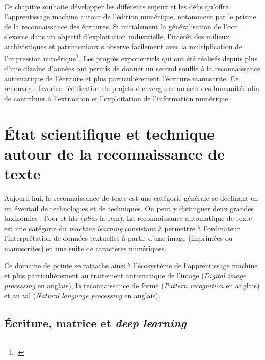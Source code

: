 	Ce chapitre souhaite développer les différents enjeux et les défis qu'offre l'apprentissage machine autour de l'édition numérique, notamment par le prisme de la reconnaissance des écritures. Si initialement la généralisation de l'\gls{ocr} s'exerce dans un objectif d'exploitation industrielle, l'intérêt des milieux archivistiques et patrimoniaux s'observe facilement avec la multiplication de l'impression numérique\footcite{mouffletAnsExperimentationTechnologie2021}. Les progrès exponentiels qui ont été réalisés depuis plus d'une dizaine d'années ont permis de donner un second souffle à la reconnaissance automatique de l'écriture et plus particulièrement l'écriture manuscrite. Ce renouveau favorise l'édification de projets d'envergures au sein des humanités afin de contribuer à l'extraction et l'exploitation de l'information numérique.
	
	\section{État scientifique et technique autour de la reconnaissance de texte}
	
	Aujourd'hui, la reconnaissance de texte est une catégorie générale se déclinant en un éventail de technologies et de techniques. On peut y distinguer deux grandes taxinomies : l'\gls{ocr} et \gls{htr} (\textit{alias} la \gls{rem}). La reconnaissance automatique de texte est une catégorie du \textit{machine learning} consistant à permettre à l'ordinateur l'interprétation de données textuelles à partir d'une image (imprimées ou manuscrites) en une suite de caractères numériques.
	
	Ce domaine de pointe se rattache ainsi à l'écosystème de l'apprentissage machine et plus particulièrement au traitement automatique de l'image (\textit{Digital image processing} en anglais), la reconnaissance de forme (\textit{Pattern recognition} en anglais) et au \gls{tal} (\textit{Natural language processing} en anglais).
	
	
	\subsection{Écriture, matrice et \textit{deep learning}}
	
